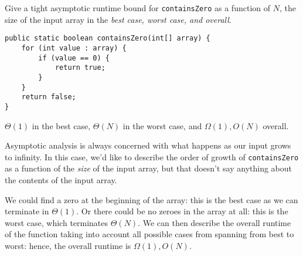 \begin{blocksection}
\question Give a tight asymptotic runtime bound for \lstinline$containsZero$ as
a function of $N$, the size of the input array in the \emph{best case, worst
case, and overall}.

\begin{lstlisting}
public static boolean containsZero(int[] array) {
    for (int value : array) {
        if (value == 0) {
            return true;
        }
    }
    return false;
}
\end{lstlisting}

\begin{solution}
$\Theta(1)$ in the best case, $\Theta(N)$ in the worst case, and $\Omega(1),
O(N)$ overall.

Asymptotic analysis is always concerned with what happens as our input grows to
infinity. In this case, we'd like to describe the order of growth of
\lstinline$containsZero$ as a function of the \emph{size} of the input array,
but that doesn't say anything about the contents of the input array.

We could find a zero at the beginning of the array: this is the best case as
we can terminate in $\Theta(1)$. Or there could be no zeroes in the array at
all: this is the worst case, which terminates $\Theta(N)$. We can then describe
the overall runtime of the function taking into account all possible cases from
spanning from best to worst: hence, the overall runtime is $\Omega(1), O(N)$.
\end{solution}
\end{blocksection}
